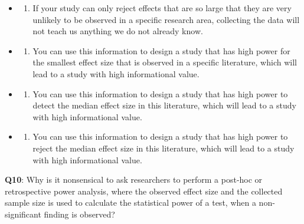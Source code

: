 \documentclass[
  letterpaper,
  DIV=11,
  numbers=noendperiod]{scrreprt}
\providecommand{\tightlist}{%
  \setlength{\itemsep}{0pt}\setlength{\parskip}{0pt}}\usepackage{longtable,booktabs,array}
\begin{document}
\begin{itemize}
\item
  \begin{enumerate}
  \def\labelenumi{(\Alph{enumi})}
  \tightlist
  \item
    If your study can only reject effects that are so large that they
    are very unlikely to be observed in a specific research area,
    collecting the data will not teach us anything we do not already
    know.\\
  \end{enumerate}
\item
  \begin{enumerate}
  \def\labelenumi{(\Alph{enumi})}
  \setcounter{enumi}{1}
  \tightlist
  \item
    You can use this information to design a study that has high power
    for the smallest effect size that is observed in a specific
    literature, which will lead to a study with high informational
    value.\\
  \end{enumerate}
\item
  \begin{enumerate}
  \def\labelenumi{(\Alph{enumi})}
  \setcounter{enumi}{2}
  \tightlist
  \item
    You can use this information to design a study that has high power
    to detect the median effect size in this literature, which will lead
    to a study with high informational value.\\
  \end{enumerate}
\item
  \begin{enumerate}
  \def\labelenumi{(\Alph{enumi})}
  \setcounter{enumi}{3}
  \tightlist
  \item
    You can use this information to design a study that has high power
    to reject the median effect size in this literature, which will lead
    to a study with high informational value.\\
  \end{enumerate}
\end{itemize}

\textbf{Q10}: Why is it nonsensical to ask researchers to perform a
post-hoc or retrospective power analysis, where the observed effect size
and the collected sample size is used to calculate the statistical power
of a test, when a non-significant finding is observed?
\end{document}
